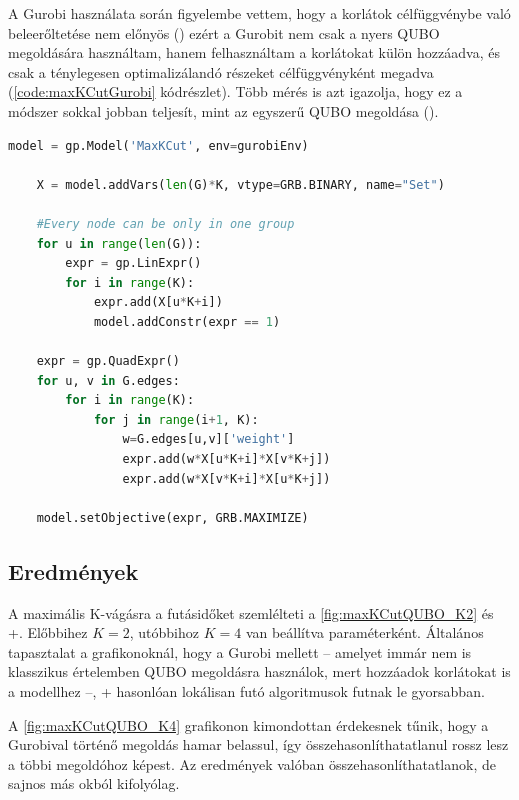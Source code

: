 A Gurobi használata során figyelembe vettem, hogy a korlátok célfüggvénybe való beleerőltetése nem előnyös () ezért a Gurobit nem csak a nyers QUBO megoldására használtam, hanem felhasználtam a korlátokat külön hozzáadva, és csak a ténylegesen optimalizálandó részeket célfüggvényként megadva (\ref{code:maxKCutGurobi} kódrészlet). Több mérés is azt igazolja, hogy ez a módszer sokkal jobban teljesít, mint az egyszerű QUBO megoldása ().

\vspace{5pt}
\begin{lstlisting}[language=python,caption=Maximális K-vágás Gurobival ,label=code:maxKCutGurobi]
  model = gp.Model('MaxKCut', env=gurobiEnv)

	X = model.addVars(len(G)*K, vtype=GRB.BINARY, name="Set")
	
	#Every node can be only in one group
	for u in range(len(G)):
		expr = gp.LinExpr()
		for i in range(K):
			expr.add(X[u*K+i])
			model.addConstr(expr == 1)
	
	expr = gp.QuadExpr()
	for u, v in G.edges:
		for i in range(K):
			for j in range(i+1, K):
				w=G.edges[u,v]['weight']
				expr.add(w*X[u*K+i]*X[v*K+j])
				expr.add(w*X[v*K+i]*X[u*K+j])
	
	model.setObjective(expr, GRB.MAXIMIZE)
\end{lstlisting}

\subsection{Eredmények}


A maximális K-vágásra a futásidőket szemlélteti a \ref{fig:maxKCutQUBO_K2} és \az+. Előbbihez $K=2$, utóbbihoz $K=4$ van beállítva paraméterként. Általános tapasztalat a grafikonoknál, hogy a Gurobi mellett -- amelyet immár nem is klasszikus értelemben QUBO megoldásra használok, mert hozzáadok korlátokat is a modellhez --, \az+ hasonlóan lokálisan futó algoritmusok futnak le gyorsabban.

A \ref{fig:maxKCutQUBO_K4} grafikonon kimondottan érdekesnek tűnik, hogy a Gurobival történő megoldás hamar belassul, így összehasonlíthatatlanul rossz lesz a többi megoldóhoz képest. Az eredmények valóban összehasonlíthatatlanok, de sajnos más okból kifolyólag.

